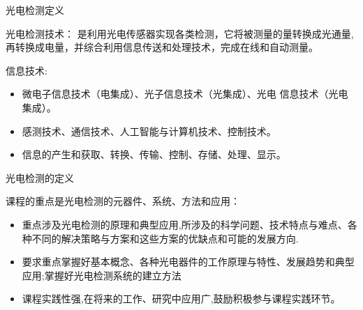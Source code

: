 \documentclass[10pt]{beamer}
\begin{document}
\begin{frame}[fragile]{光电检测定义}
\begin{alertblock}{光电检测技术：}
		是利用光电传感器实现各类检测，它将被测量的量转换成光通量,再转换成电量，并综合利用信息传送和处理技术，完成在线和自动测量。

	\end{alertblock}
	
	
	 信息技术:   
  \begin{itemize}
    \item 微电子信息技术（电集成）、光子信息技术（光集成）、光电 信息技术（光电集成）。
    \item 感测技术、通信技术、人工智能与计算机技术、控制技术。
    \item 信息的产生和获取、转换、传输、控制、存储、处理、显示。
 
 \end{itemize}

\end{frame}


\begin{frame}{光电检测的定义}

课程的重点是光电检测的元器件、系统、方法和应用：

  \begin{itemize}
      \item 重点涉及光电检测的原理和典型应用,所涉及的科学问题、技术特点与难点、各种不同的解决策略与方案和这些方案的优缺点和可能的发展方向.
      \item 要求重点掌握好\alert{基本概念}、各种光电器件的\alert{工作原理与特性}、发展趋势和典型应用;掌握好\alert{光电检测系统的建立方法}
      \item 课程实践性强,在将来的工作、研究中应用广,鼓励积极参与课程实践环节。

  \end{itemize}
  

\end{frame}
\end{document}
